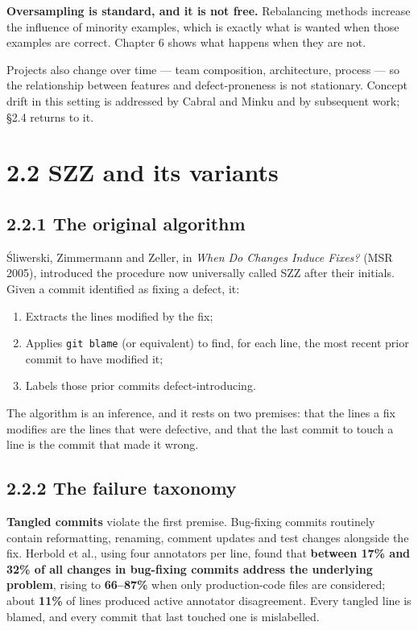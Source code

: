 \textbf{Oversampling is standard, and it is not free.} Rebalancing
methods increase the influence of minority examples, which is exactly
what is wanted when those examples are correct. Chapter 6 shows what
happens when they are not.

Projects also change over time --- team composition, architecture,
process --- so the relationship between features and defect-proneness is
not stationary. Concept drift in this setting is addressed by Cabral and
Minku and by subsequent work; \S{}2.4 returns to it.

\section{2.2 SZZ and its variants}\label{szz-and-its-variants}

\subsection{2.2.1 The original algorithm}\label{the-original-algorithm}

\'{S}liwerski, Zimmermann and Zeller, in \emph{When Do Changes Induce
Fixes?} (MSR 2005), introduced the procedure now universally called SZZ
after their initials. Given a commit identified as fixing a defect, it:

\begin{enumerate}
\def\labelenumi{\arabic{enumi}.}
\tightlist
\item
  Extracts the lines modified by the fix;
\item
  Applies \texttt{git\ blame} (or equivalent) to find, for each line,
  the most recent prior commit to have modified it;
\item
  Labels those prior commits defect-introducing.
\end{enumerate}

The algorithm is an inference, and it rests on two premises: that the
lines a fix modifies are the lines that were defective, and that the
last commit to touch a line is the commit that made it wrong.

\subsection{2.2.2 The failure taxonomy}\label{the-failure-taxonomy}

\textbf{Tangled commits} violate the first premise. Bug-fixing commits
routinely contain reformatting, renaming, comment updates and test
changes alongside the fix. Herbold et al., using four annotators per
line, found that \textbf{between 17\% and 32\% of all changes in
bug-fixing commits address the underlying problem}, rising to
\textbf{66--87\%} when only production-code files are considered; about
\textbf{11\%} of lines produced active annotator disagreement. Every
tangled line is blamed, and every commit that last touched one is
mislabelled.

